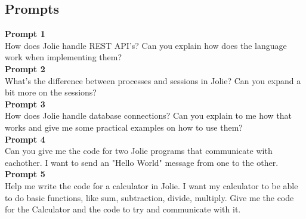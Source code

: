 \documentclass[12pt]{article}
\begin{document}
\subsection{Prompts}
\textbf{Prompt 1}\\
How does Jolie handle REST API's? Can you explain how does the language work when implementing them?\vspace{14pt}\\
\textbf{Prompt 2}\\
What's the difference between processes and sessions in Jolie? Can you expand a bit more on the sessions?\vspace{14pt}\\
\textbf{Prompt 3}\\
How does Jolie handle database connections? Can you explain to me how that works and give me some practical examples on how to use them?\vspace{14pt}\\
\textbf{Prompt 4}\\
Can you give me the code for two Jolie programs that communicate with eachother. I want to send an "Hello World" message from one to the other.\vspace{14pt}\\
\textbf{Prompt 5}\\
Help me write the code for a calculator in Jolie. I want my calculator to be able to do basic functions, like sum, subtraction, divide, multiply. Give me the code for the Calculator and the code to try and communicate with it.
\end{document}
